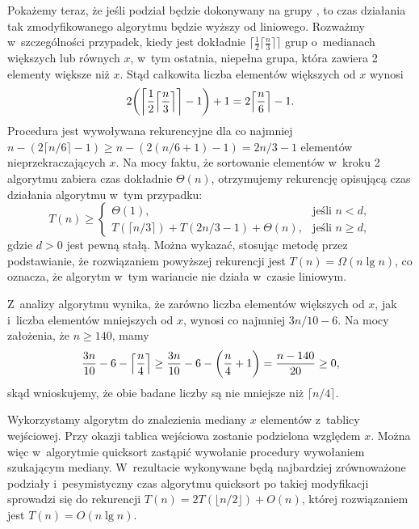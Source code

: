 Pokażemy teraz, że jeśli podział będzie dokonywany na grupy , to czas działania tak zmodyfikowanego algorytmu  będzie wyższy od liniowego.
Rozważmy w~szczególności przypadek, kiedy jest dokładnie $\bigl\lceil\frac{1}{2}\bigl\lceil\frac{n}{3}\bigr\rceil\bigr\rceil$ grup o~medianach większych lub równych $x$, w~tym ostatnia, niepełna grupa, która zawiera 2 elementy większe niż $x$.
Stąd całkowita liczba elementów większych od $x$ wynosi
\[
	2\biggl(\biggl\lceil\frac{1}{2}\Bigl\lceil\frac{n}{3}\Bigr\rceil\biggr\rceil-1\biggr)+1 = 2\Bigl\lceil\frac{n}{6}\Bigr\rceil-1.
\]
Procedura jest wywoływana rekurencyjne dla co najmniej $n-(2\lceil n/6\rceil-1)\ge n-(2(n/6+1)-1)=2n/3-1$ elementów nieprzekraczających $x$.
Na mocy faktu, że sortowanie elementów w~kroku 2 algorytmu  zabiera czas dokładnie $\Theta(n)$, otrzymujemy rekurencję opisującą czas działania algorytmu w~tym przypadku:
\[
	T(n) \ge \begin{cases}
		\Theta(1), & \text{jeśli $n<d$}, \\
		T(\lceil n/3\rceil)+T(2n/3-1)+\Theta(n), & \text{jeśli $n\ge d$},
	\end{cases}
\]
gdzie $d>0$ jest pewną stałą.
Można wykazać, stosując metodę przez podstawianie, że rozwiązaniem powyższej rekurencji jest $T(n)=\Omega(n\lg n)$, co oznacza, że algorytm w~tym wariancie nie działa w~czasie liniowym.

\exercise %
Z~analizy algorytmu  wynika, że zarówno liczba elementów większych od $x$, jak i~liczba elementów mniejszych od $x$, wynosi co najmniej $3n/10-6$.
Na mocy założenia, że $n\ge140$, mamy
\[
	\frac{3n}{10}-6-\Bigl\lceil\frac{n}{4}\Bigr\rceil \ge \frac{3n}{10}-6-\biggl(\frac{n}{4}+1\biggr) = \frac{n-140}{20} \ge 0,
\]
skąd wnioskujemy, że obie badane liczby są nie mniejsze niż $\lceil n/4\rceil$.

\exercise %

\noindent Wykorzystamy algorytm  do znalezienia mediany $x$ elementów z~tablicy wejściowej.
Przy okazji tablica wejściowa zostanie podzielona względem $x$.
Można więc w~algorytmie quicksort zastąpić wywołanie procedury  wywołaniem  szukającym mediany.
W~rezultacie wykonywane będą najbardziej zrównoważone podziały i~pesymistyczny czas algorytmu quicksort po takiej modyfikacji sprowadzi się do rekurencji $T(n)=2T(\lfloor n/2\rfloor)+O(n)$, której rozwiązaniem jest $T(n)=O(n\lg n)$.


